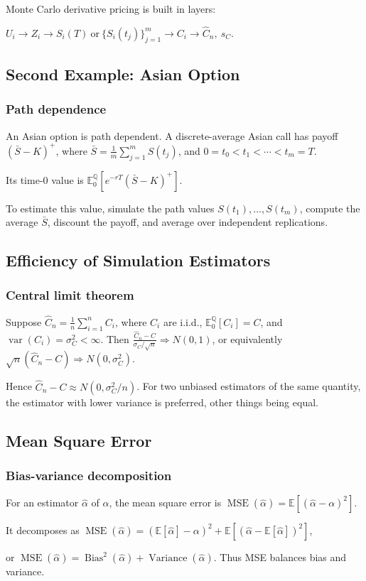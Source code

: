Monte Carlo derivative pricing is built in layers:

$U_i\to Z_i\to S_i(T)\ \text{or}\ \{S_i(t_j)\}_{j=1}^m\to C_i\to \hat{C}_n,\ s_C$.


\subsection{Second Example: Asian Option}

\subsubsection*{Path dependence}

An Asian option is path dependent. A discrete-average Asian call has payoff $(\bar{S}-K)^+$, where
$\bar{S}=\frac{1}{m}\sum_{j=1}^m S(t_j)$,
and $0=t_0<t_1<\cdots<t_m=T$. 

Its time-$0$ value is
$\mathbb{E}_0^{\mathbb{Q}}\left[e^{-rT}(\bar{S}-K)^+\right]$.

To estimate this value, simulate the path values $S(t_1),\ldots,S(t_m)$, compute the average $\bar{S}$, discount the payoff, and average over independent replications.

\subsection{Efficiency of Simulation Estimators}

\subsubsection*{Central limit theorem}

Suppose $\hat{C}_n=\frac{1}{n}\sum_{i=1}^n C_i$, where $C_i$ are i.i.d., $\mathbb{E}_0^{\mathbb{Q}}[C_i]=C$, and $\operatorname{var}(C_i)=\sigma_C^2<\infty$. Then
$\frac{\hat{C}_n-C}{\sigma_C/\sqrt{n}}\Rightarrow N(0,1)$,
or equivalently
$\sqrt{n}(\hat{C}_n-C)\Rightarrow N(0,\sigma_C^2)$.

Hence $\hat{C}_n-C\approx N(0,\sigma_C^2/n)$. For two unbiased estimators of the same quantity, the estimator with lower variance is preferred, other things being equal.



\subsection{Mean Square Error}

\subsubsection*{Bias-variance decomposition}

For an estimator $\hat{\alpha}$ of $\alpha$, the mean square error is
$\operatorname{MSE}(\hat{\alpha})=\mathbb{E}\left[(\hat{\alpha}-\alpha)^2\right]$.

It decomposes as
$\operatorname{MSE}(\hat{\alpha})=\left(\mathbb{E}[\hat{\alpha}]-\alpha\right)^2+\mathbb{E}\left[\left(\hat{\alpha}-\mathbb{E}[\hat{\alpha}]\right)^2\right]$,

or
$\operatorname{MSE}(\hat{\alpha})=\operatorname{Bias}^2(\hat{\alpha})+\operatorname{Variance}(\hat{\alpha})$.
Thus MSE balances bias and variance.

